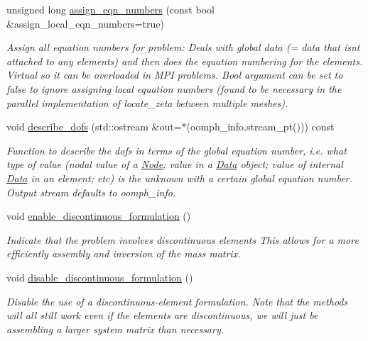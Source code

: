 \begin{DoxyCompactItemize}
unsigned long \hyperlink{classoomph_1_1Problem_a0df501c6aed60c4938861df776b10119}{assign\+\_\+eqn\+\_\+numbers} (const bool \&assign\+\_\+local\+\_\+eqn\+\_\+numbers=true)
\begin{DoxyCompactList}\small\item\em Assign all equation numbers for problem\+: Deals with global data (= data that isn\textquotesingle{}t attached to any elements) and then does the equation numbering for the elements. Virtual so it can be overloaded in M\+PI problems. Bool argument can be set to false to ignore assigning local equation numbers (found to be necessary in the parallel implementation of locate\+\_\+zeta between multiple meshes). \end{DoxyCompactList}\item 
void \hyperlink{classoomph_1_1Problem_abc103804eb319ae0b3d43870cc3e1eaf}{describe\+\_\+dofs} (std\+::ostream \&out=$\ast$(oomph\+\_\+info.\+stream\+\_\+pt())) const
\begin{DoxyCompactList}\small\item\em Function to describe the dofs in terms of the global equation number, i.\+e. what type of value (nodal value of a \hyperlink{classoomph_1_1Node}{Node}; value in a \hyperlink{classoomph_1_1Data}{Data} object; value of internal \hyperlink{classoomph_1_1Data}{Data} in an element; etc) is the unknown with a certain global equation number. Output stream defaults to oomph\+\_\+info. \end{DoxyCompactList}\item 
void \hyperlink{classoomph_1_1Problem_af4fbd755b3ce6b86fa0f1b1f29bd08f0}{enable\+\_\+discontinuous\+\_\+formulation} ()
\begin{DoxyCompactList}\small\item\em Indicate that the problem involves discontinuous elements This allows for a more efficiently assembly and inversion of the mass matrix. \end{DoxyCompactList}\item 
void \hyperlink{classoomph_1_1Problem_afa64d728ceff0dd772bbbc8f2adcddfb}{disable\+\_\+discontinuous\+\_\+formulation} ()
\begin{DoxyCompactList}\small\item\em Disable the use of a discontinuous-\/element formulation. Note that the methods will all still work even if the elements are discontinuous, we will just be assembling a larger system matrix than necessary. \end{DoxyCompactList}\item 

\end{DoxyCompactItemize}

